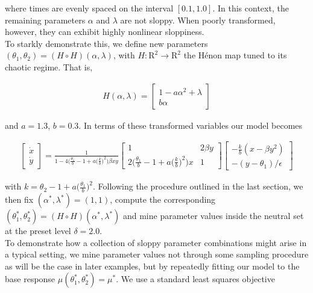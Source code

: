 \documentclass{article}
\newcommand{\p}{\theta}
\newcommand{\omr}{\mu}
\newcommand{\R}{\mathrm{R}}
\begin{document}
where times are evenly spaced on the interval $[0.1, 1.0]$. In this context, the remaining parameters
$\alpha$ and $\lambda$ are not sloppy.
When poorly transformed, however, they can exhibit highly nonlinear sloppiness.\\

To starkly demonstrate this, we define new parameters $(\p_1,\p_2) =
(H \circ H)(\alpha,\lambda)$, with $H : \R^2 \to \R^2$ the H\'enon map
tuned to its chaotic regime. That is,

\begin{align*}
  H(\alpha, \lambda) = \begin{bmatrix} 1 - a \alpha^2 + \lambda \\  b
    \alpha \end{bmatrix}
\end{align*}

and $a = 1.3$, $b = 0.3$. In terms of these transformed variables
our model becomes

\begin{align}
  \begin{bmatrix} \dot{x} \\ \dot{y} \end{bmatrix}  = \frac{1}{1 -
  4 \bigg( \frac{\p_1}{b} - 1 + a \bigg( \frac{k}{b} \bigg)^2 \bigg) \beta x y} \begin{bmatrix} 1 &
  2\beta y \\ 2 \bigg( \frac{\p_1}{b} - 1 + a \bigg( \frac{k}{b} \bigg)^2 \bigg) x  &
  1 \end{bmatrix} \begin{bmatrix} - \frac{k}{b}(x - \beta y^2) \\ -(y -
  \p_1)/\epsilon \end{bmatrix} 
\label{m.henon}
\end{align}

with $k = {\p_2 - 1 + a
  \big(\frac{\p_1}{b}\big)^2}$. Following the procedure outlined in the last
section, we then fix $(\alpha^*,\lambda^*) = (1,1)$, compute the
corresponding $(\p_1^*,\p_2^*) = (H \circ H)(\alpha^*,\lambda^*)$ and
mine parameter values inside the neutral set at the preset level
$\delta = 2.0$. \\

To demonstrate how a collection of sloppy parameter combinations might
arise in a typical setting, we mine parameter values not through some
sampling procedure as will be the case in later examples, but by
repeatedly fitting our model to the base response $\omr(\p_1^*,
\p_2^*) = \omr^*$. We use a standard least squares objective
\end{document}
